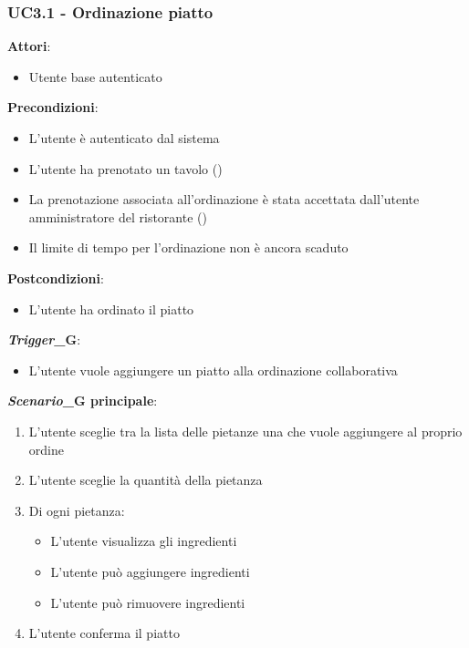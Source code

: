 \subsubsection{UC3.1 - Ordinazione piatto}\label{usecase:3_1}

\textbf{Attori}:
\begin{itemize}
    \item Utente base autenticato
\end{itemize}
\textbf{Precondizioni}:
\begin{itemize}
    \item L'utente è autenticato dal sistema 
    \item L'utente ha prenotato un tavolo ()
    \item La prenotazione associata all'ordinazione è stata accettata dall'utente amministratore del ristorante ()
    \item Il limite di tempo per l'ordinazione non è ancora scaduto
\end{itemize}
\textbf{Postcondizioni}:
\begin{itemize}
    \item L'utente ha ordinato il piatto
\end{itemize}
\textbf{\textit{Trigger}_G}:
\begin{itemize}
    \item L'utente vuole aggiungere un piatto alla ordinazione collaborativa
\end{itemize}
\textbf{\textit{Scenario}_G principale}:
\begin{enumerate}
    \item L'utente sceglie tra la lista delle pietanze una che vuole aggiungere al proprio ordine
    \item L'utente sceglie la quantità della pietanza
    \item Di ogni pietanza:
    \begin{itemize}
        \item L'utente visualizza gli ingredienti
        \item L'utente può aggiungere ingredienti
        \item L'utente può rimuovere ingredienti
    \end{itemize}
    \item L'utente conferma il piatto
\end{enumerate}
\newpage

